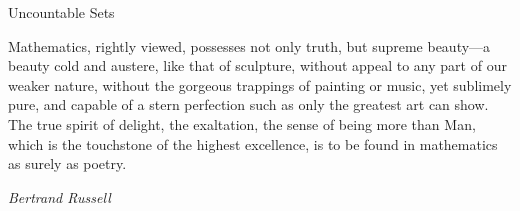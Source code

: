 \begin{section}{Uncountable Sets}
\epigraph{Mathematics, rightly viewed, possesses not only truth, but supreme beauty---a beauty cold and austere, like that of sculpture, without appeal to any part of our weaker nature, without the gorgeous trappings of painting or music, yet sublimely pure, and capable of a stern perfection such as only the greatest art can show. The true spirit of delight, the exaltation, the sense of being more than Man, which is the touchstone of the highest excellence, is to be found in mathematics as surely as poetry.}{\emph{Bertrand Russell}}

\end{section}